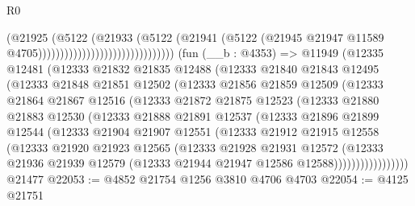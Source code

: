 \begin{lexlean}{R0}
\begin{coremodule}
                                                    (@21925
                                                      (@5122
                                                        (@21933
                                                          (@5122
                                                            (@21941
                                                              (@5122
                                                                (@21945
                                                                  @21947
                                                                  @11589
                                                                  @4705)))))))))))))))))))))))))))))))
    (fun (__b : @4353) =>
    @11949
      (@12335
        @12481
        (@12333
          @21832
          @21835
          @12488
          (@12333
            @21840
            @21843
            @12495
            (@12333
              @21848
              @21851
              @12502
              (@12333
                @21856
                @21859
                @12509
                (@12333
                  @21864
                  @21867
                  @12516
                  (@12333
                    @21872
                    @21875
                    @12523
                    (@12333
                      @21880
                      @21883
                      @12530
                      (@12333
                        @21888
                        @21891
                        @12537
                        (@12333
                          @21896
                          @21899
                          @12544
                          (@12333
                            @21904
                            @21907
                            @12551
                            (@12333
                              @21912
                              @21915
                              @12558
                              (@12333
                                @21920
                                @21923
                                @12565
                                (@12333
                                  @21928
                                  @21931
                                  @12572
                                  (@12333
                                    @21936
                                    @21939
                                    @12579
                                    (@12333 @21944 @21947 @12586 @12588)))))))))))))))))
    @21477
@22053 := @4852 @21754 @1256 @3810 @4706 @4703
@22054 := @4125 @21751

\end{coremodule}
\end{lexlean}
